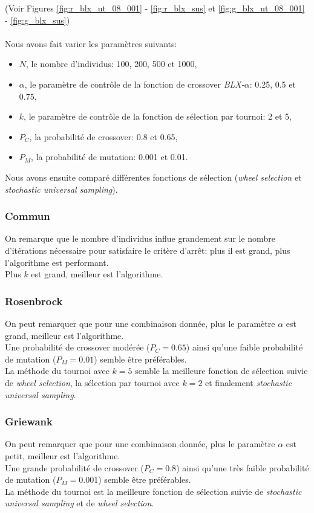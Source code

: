 \documentclass[12pt, letterpaper]{article}
\begin{document}
(Voir Figures \ref{fig:r_blx_ut_08_001} - \ref{fig:r_blx_sus}
et \ref{fig:g_blx_ut_08_001} - \ref{fig:g_blx_sus})
\\
\\
Nous avons fait varier les paramètres suivants:
\begin{itemize}
\item $N$, le nombre d'individus: 100, 200, 500 et 1000,
\item $\alpha$, le paramètre de contrôle de la fonction de crossover \textit{BLX-$\alpha$}: 0.25, 0.5 et 0.75,
\item $k$, le paramètre de contrôle de la fonction de sélection par tournoi: 2 et 5,
\item $P_C$, la probabilité de crossover: 0.8 et 0.65,
\item $P_M$, la probabilité de mutation: 0.001 et 0.01.
\end{itemize}

Nous avons ensuite comparé différentes fonctions de sélection (\textit{wheel
selection} et \textit{stochastic universal sampling}).

\subsubsection{Commun}

On remarque que le nombre d'individus influe grandement sur le nombre
d'itérations nécessaire pour satisfaire le critère d'arrêt: plus il
est grand, plus l'algorithme est performant.
\\
Plus $k$ est grand, meilleur est l'algorithme.

\subsubsection{Rosenbrock}
On peut remarquer que pour une combinaison donnée, plus le paramètre
$\alpha$ est grand, meilleur est l'algorithme.
\\
Une probabilité de crossover modérée ($P_C = 0.65$) ainsi qu'une
faible probabilité de mutation ($P_M = 0.01$) semble être préférables.
\\
La méthode du tournoi avec $k = 5$ semble la meilleure fonction de
sélection suivie de \textit{wheel selection}, la sélection par tournoi
avec $k = 2$ et finalement \textit{stochastic universal sampling}.

\subsubsection{Griewank}
On peut remarquer que pour une combinaison donnée, plus le paramètre
$\alpha$ est petit, meilleur est l'algorithme.
\\
Une grande probabilité de crossover ($P_C = 0.8$) ainsi qu'une très
faible probabilité de mutation ($P_M = 0.001$) semble être
préférables.
\\
La méthode du tournoi est la meilleure fonction de sélection suivie de
\textit{stochastic universal sampling} et de \textit{wheel selection}.
\end{document}
